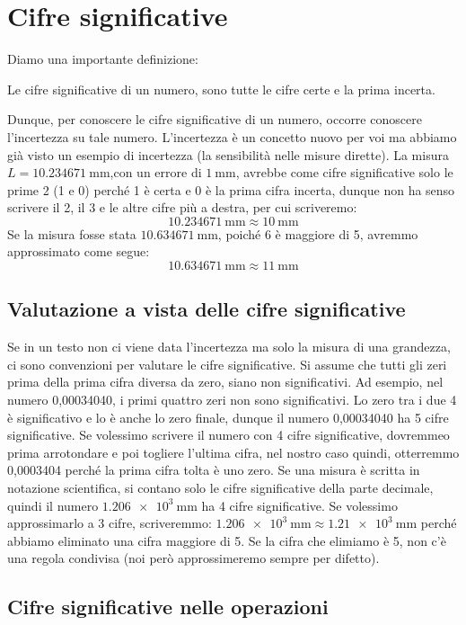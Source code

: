 \section{Cifre significative}
	Diamo una importante definizione:
\begin{csf}
	Le cifre significative di un numero, sono tutte le cifre certe e la prima incerta.
\end{csf}
Dunque, per conoscere le cifre significative di un numero, occorre conoscere l'incertezza su tale numero. L'incertezza è un concetto nuovo per voi ma abbiamo già visto un esempio di incertezza (la sensibilità nelle misure dirette). La misura $L = \SI{10,234671}{\milli\meter}$,con un errore di $\SI{1}{\milli\meter}$, avrebbe come cifre significative solo le prime 2 (1 e 0) perché 1 è certa e 0 è la prima cifra incerta, dunque non ha senso scrivere il 2, il 3 e le altre cifre più a destra, per cui scriveremo:
\[
\SI{10,234671}{\milli\meter} \approx \SI{10}{\milli\meter}
\]
Se la misura fosse stata $\SI{10,634671}{\milli\meter}$, poiché 6 è maggiore di 5, avremmo approssimato come segue:
\[
\SI{10,634671}{\milli\meter} \approx \SI{11}{\milli\meter}
\]
\subsection{Valutazione a vista delle cifre significative}
Se in un testo non ci viene data l'incertezza ma solo la misura di una grandezza, ci sono convenzioni per valutare le cifre significative. Si assume che tutti gli zeri prima della prima cifra diversa da zero, siano non significativi. Ad esempio, nel numero 0,00034040, i primi quattro zeri non sono significativi. Lo zero tra i due 4 è significativo e lo è anche lo zero finale, dunque il numero 0,00034040 ha 5 cifre significative. Se volessimo scrivere il numero con 4 cifre significative, dovremmeo prima arrotondare e poi togliere l'ultima cifra, nel nostro caso quindi, otterremmo 0,0003404 perché la prima cifra tolta è uno zero. Se una misura è scritta in notazione scientifica, si contano solo le cifre significative della parte decimale, quindi il numero $\SI{1,206e+3}{\milli\meter}$ ha 4 cifre significative. Se volessimo approssimarlo a 3 cifre, scriveremmo: $\SI{1,206e+3}{\milli\meter} \approx \SI{1,21e+3}{\milli\meter}$ perché abbiamo eliminato una cifra maggiore di 5. Se la cifra che elimiamo è 5, non c'è una regola condivisa (noi però approssimeremo sempre per difetto).



\subsection{Cifre significative nelle operazioni}


